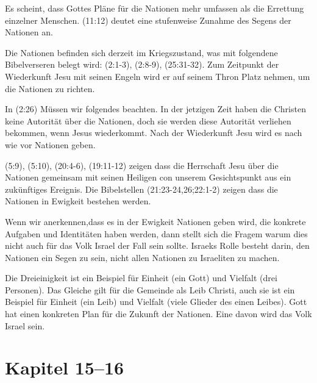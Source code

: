 \documentclass{../../inc/mybib}
\begin{document}
Es scheint, dass Gottes Pläne für die Nationen mehr umfassen als die Errettung einzelner Menschen. (11:12) deutet eine stufenweise Zunahme des Segens der Nationen an.

Die Nationen befinden sich derzeit im Kriegszustand, was mit folgendene Bibelverseren belegt wird: (2:1-3), (2:8-9), (25:31-32). Zum Zeitpunkt der Wiederkunft Jesu mit seinen Engeln wird er auf seinem Thron Platz nehmen, um die Nationen zu richten.

In (2:26) Müssen wir folgendes beachten. In der jetzigen Zeit haben die Christen keine Autorität über die Nationen, doch sie werden diese Autorität verliehen bekommen, wenn Jesus wiederkommt. Nach der Wiederkunft Jesu wird es nach wie vor Nationen geben.

(5:9), (5:10), (20:4-6), (19:11-12) zeigen dass die Herrschaft Jesu über die Nationen gemeinsam mit seinen Heiligen con unserem Gesichtspunkt aus ein zukünftiges Ereignis.
Die Bibelstellen (21:23-24,26;22:1-2) zeigen dass die Nationen in Ewigkeit bestehen werden.

Wenn wir anerkennen,dass es in der Ewigkeit Nationen geben wird, die konkrete Aufgaben und Identitäten haben werden, dann stellt sich die Fragem warum dies nicht auch für das Volk Israel der Fall sein sollte. Israeks Rolle besteht darin, den Nationen ein Segen zu sein, nicht allen Nationen zu Israeliten zu machen.

Die Dreieinigkeit ist ein Beispiel für Einheit (ein Gott) und Vielfalt (drei Personen). Das Gleiche gilt für die Gemeinde als Leib Christi, auch sie ist ein Beispiel für Einheit (ein Leib) und Vielfalt (viele Glieder des einen Leibes). Gott hat einen konkreten Plan für die Zukunft der Nationen. Eine davon wird das Volk Israel sein.

\section{Kapitel 15--16}
\end{document}
